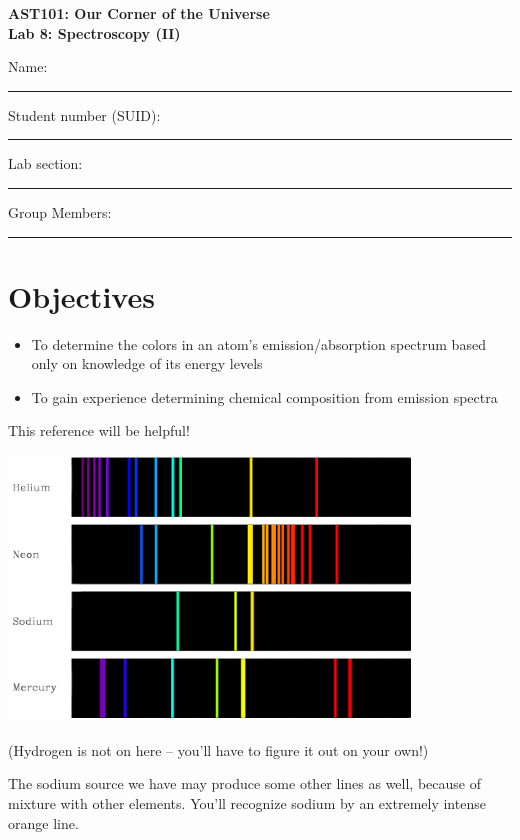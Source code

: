 \documentclass[11pt]{article}
\begin{document}
\begin{center}
\textbf{\Large
AST101: Our Corner of the Universe \\
\vspace*{0.1cm}
Lab 8: Spectroscopy (II)
}
\end{center}

\vspace*{0.5cm}

{\Large Name:}\vspace*{0.5cm}\\\hrule
{\Large Student number (SUID):}\vspace*{0.5cm}\\\hrule
{\Large Lab section:}\vspace*{0.5cm}\\\hrule
{\Large Group Members:}\vspace*{0.5cm}\\\hrule
\vspace*{0.5cm}


\section{Objectives}
\begin{itemize}
	\item To determine the colors in an atom's emission/absorption spectrum based only on knowledge of its energy levels
	\item To gain experience determining chemical composition from emission spectra
\end{itemize}

\begin{center}
	\large This reference will be helpful!
	
	\includegraphics[width=0.8\textwidth]{spectra.png}
	
	(Hydrogen is not on here -- you'll have to figure it out on your own!)
	
	The sodium source we have may produce some other lines as well, because of mixture with other elements. You'll recognize
	sodium by an extremely intense orange line.
\end{center}
\newpage
\end{document}
